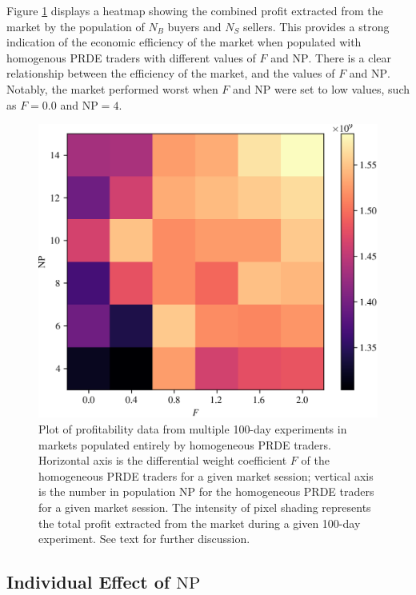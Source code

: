 \documentclass[conference]{IEEEtran}
\begin{document}
Figure \ref{profit_grid} displays a heatmap showing the combined profit extracted from the market by the population of $N_B$ buyers and $N_S$ sellers.
This provides a strong indication of the economic efficiency of the market when populated with homogenous PRDE traders with different values of $F$ and $\mathrm{NP}$.
There is a clear relationship between the efficiency of the market, and the values of $F$ and $\mathrm{NP}$.
Notably, the market performed worst when $F$ and $\mathrm{NP}$ were set to low values, such as $F=0.0$ and $\mathrm{NP}=4$.

\begin{figure}[htbp]
    \centerline{\includegraphics[width=\columnwidth]{profit_grid.png}}
    \caption{
        Plot of profitability data from multiple 100-day experiments in markets populated entirely by homogeneous PRDE traders.
        Horizontal axis is the differential weight coefficient $F$ of the homogeneous PRDE traders for a given market session; vertical axis is the number in population $\mathrm{NP}$ for the homogeneous PRDE traders for a given market session.
        The intensity of pixel shading represents the total profit extracted from the market during a given 100-day experiment.
        See text for further discussion.
    }
    \label{profit_grid}
\end{figure}

\subsection{Individual Effect of $\mathrm{NP}$}
\end{document}
